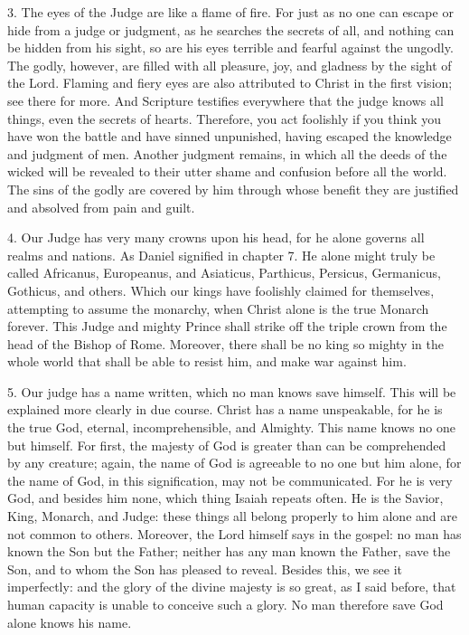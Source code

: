 3. The eyes of the Judge are like a flame of fire. For just as no one can escape or hide from a judge or judgment, as he searches the secrets of all, and nothing can be hidden from his sight, so are his eyes terrible and fearful against the ungodly. The godly, however, are filled with all pleasure, joy, and gladness by the sight of the Lord. Flaming and fiery eyes are also attributed to Christ in the first vision; see there for more. And Scripture testifies everywhere that the judge knows all things, even the secrets of hearts. Therefore, you act foolishly if you think you have won the battle and have sinned unpunished, having escaped the knowledge and judgment of men. Another judgment remains, in which all the deeds of the wicked will be revealed to their utter shame and confusion before all the world. The sins of the godly are covered by him through whose benefit they are justified and absolved from pain and guilt.

4. Our Judge has very many crowns upon his head, for he alone governs all realms and nations. As Daniel signified in chapter 7. He alone might truly be called Africanus, Europeanus, and Asiaticus, Parthicus, Persicus, Germanicus, Gothicus, and others. Which our kings have foolishly claimed for themselves, attempting to assume the monarchy, when Christ alone is the true Monarch forever. This Judge and mighty Prince shall strike off the triple crown from the head of the Bishop of Rome. Moreover, there shall be no king so mighty in the whole world that shall be able to resist him, and make war against him.

5. Our judge has a name written, which no man knows save himself. This will be explained more clearly in due course. Christ has a name unspeakable, for he is the true God, eternal, incomprehensible, and Almighty. This name knows no one but himself. For first, the majesty of God is greater than can be comprehended by any creature; again, the name of God is agreeable to no one but him alone, for the name of God, in this signification, may not be communicated. For he is very God, and besides him none, which thing Isaiah repeats often. He is the Savior, King, Monarch, and Judge: these things all belong properly to him alone and are not common to others. Moreover, the Lord himself says in the gospel: no man has known the Son but the Father; neither has any man known the Father, save the Son, and to whom the Son has pleased to reveal. Besides this, we see it imperfectly: and the glory of the divine majesty is so great, as I said before, that human capacity is unable to conceive such a glory. No man therefore save God alone knows his name.

